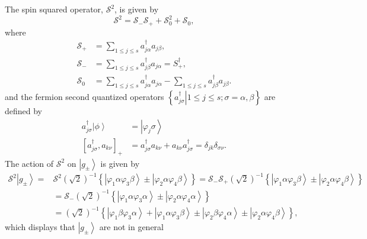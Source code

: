 \documentclass[aps,preprint]{revtex4}%
\begin{document}
The spin squared operator, $\mathcal{S}^{2}$, is given by
\begin{equation}
\mathcal{S}^{2}=\mathcal{S}_{-}\mathcal{S}_{+}+\mathcal{S}_{0}^{2}%
+\mathcal{S}_{0},
\end{equation}
where
\begin{align}
\mathcal{S}_{+}  &  =\sum_{1\leq j\leq s}a_{j\alpha}^{\dagger}a_{j\beta},\\
\mathcal{S}_{-}  &  =\sum_{1\leq j\leq s}a_{j\beta}^{\dagger}a_{j\alpha}%
=S_{+}^{\dagger},\\
\mathcal{S}_{0}  &  =\sum_{1\leq j\leq s}a_{j\alpha}^{\dagger}a_{j\alpha}%
-\sum_{1\leq j\leq s}a_{j\beta}^{\dagger}a_{j\beta}.
\end{align}
and the fermion second quantized operators $\left\{  \left.  a_{j\sigma
}^{\dagger}\right\vert 1\leq j\leq s;\sigma=\alpha,\beta\right\}  $ are
defined by%
\begin{align}
a_{j\sigma}^{\dagger}\left\vert \phi\right\rangle  &  =\left\vert \varphi
_{j}\sigma\right\rangle \nonumber\\
\left[  a_{j\sigma}^{\dagger},a_{k\nu}\right]  _{+}  &  =a_{j\sigma}^{\dagger
}a_{k\nu}+a_{k\nu}a_{j\sigma}^{\dagger}=\delta_{jk}\delta_{\sigma\nu}.
\end{align}
The action of $\mathcal{S}^{2}$ on $\left\vert g_{\pm}\right\rangle $ is given
by
\begin{align}
\mathcal{S}^{2}\left\vert g_{\pm}\right\rangle =  &  \mathcal{S}^{2}\left(
\sqrt{2}\right)  ^{-1}\left\{  \left\vert \varphi_{1}\alpha\varphi_{3}%
\beta\right\rangle \pm\left\vert \varphi_{2}\alpha\varphi_{4}\beta
\right\rangle \right\}  =\mathcal{S}_{-}\mathcal{S}_{+}\left(  \sqrt
{2}\right)  ^{-1}\left\{  \left\vert \varphi_{1}\alpha\varphi_{3}%
\beta\right\rangle \pm\left\vert \varphi_{2}\alpha\varphi_{4}\beta
\right\rangle \right\} \nonumber\\
&  =\mathcal{S}_{-}\left(  \sqrt{2}\right)  ^{-1}\left\{  \left\vert
\varphi_{1}\alpha\varphi_{3}\alpha\right\rangle \pm\left\vert \varphi
_{2}\alpha\varphi_{4}\alpha\right\rangle \right\} \nonumber\\
&  =\left(  \sqrt{2}\right)  ^{-1}\left\{  \left\vert \varphi_{1}\beta
\varphi_{3}\alpha\right\rangle +\left\vert \varphi_{1}\alpha\varphi_{3}%
\beta\right\rangle \pm\left\vert \varphi_{2}\beta\varphi_{4}\alpha
\right\rangle \pm\left\vert \varphi_{2}\alpha\varphi_{4}\beta\right\rangle
\right\}  ,
\end{align}
which displays that $\left\vert g_{\pm}\right\rangle $ are not in general
\end{document}
